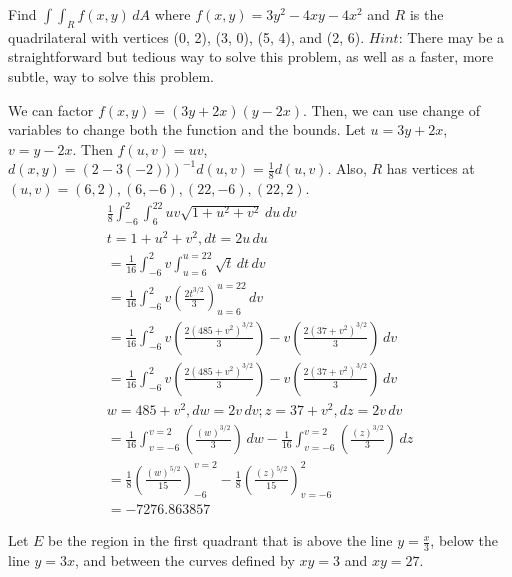 \documentclass[12pt]{exam}
\begin{document}
\begin{questions}
\question Find $\int\int_R f(x, y)\, dA$ where $f(x, y) = 3y^2 - 4xy - 4x^2$ and $R$ is the quadrilateral with vertices (0, 2), (3, 0), (5, 4), and (2, 6). $Hint$: There may be a straightforward but tedious way to solve this problem, as well as a faster, more subtle, way to solve this problem.
	\begin{solution}
		We can factor $f(x, y) = (3y+2x)(y-2x)$. Then, we can use change of variables to change both the function and the bounds. Let $u = 3y + 2x$, $v = y - 2x$. Then $f(u, v) = uv$, $d(x, y) = \left(2 - 3(-2))\right)^{-1} d(u, v) = \frac{1}{8}d(u, v)$. Also, $R$ has vertices at $(u, v) = (6, 2), (6, -6), (22, -6), (22, 2)$.\\
		\begin{gather*}
			\frac{1}{8} \int_{-6}^{2} \int_{6}^{22} uv\sqrt{1 + u^2 + v^2} \, du\, dv \\
			t = 1 + u^2 + v^2, dt = 2u\, du \\
			= \frac{1}{16} \int_{-6}^{2} v \int_{u=6}^{u=22} \sqrt{t} \, dt\, dv \\
			= \frac{1}{16} \int_{-6}^{2} v  \left(\frac{2t^{3/2}}{3}\right)_{u=6}^{u=22}\, dv \\
			= \frac{1}{16} \int_{-6}^{2} v \left(\frac{2(485+v^2)^{3/2}}{3}\right) - v\left(\frac{2(37+v^2)^{3/2}}{3}\right) \, dv \\
			= \frac{1}{16} \int_{-6}^{2} v \left(\frac{2(485+v^2)^{3/2}}{3}\right) - v\left(\frac{2(37+v^2)^{3/2}}{3}\right) \, dv \\
			w = 485+v^2, dw = 2v\, dv; z = 37+v^2, dz = 2v\, dv \\
			= \frac{1}{16} \int_{v = -6}^{v = 2} \left(\frac{(w)^{3/2}}{3}\right) \, dw - \frac{1}{16} \int_{v = -6}^{v = 2} \left(\frac{(z)^{3/2}}{3}\right) \, dz \\
			= \frac{1}{8} \left(\frac{(w)^{5/2}}{15}\right)_{-6}^{v = 2} - \frac{1}{8} \left(\frac{(z)^{5/2}}{15}\right)_{v = -6}^{2} \\
			= \boxed{-7276.863857} \tag*{\qed}
		\end{gather*}
	\end{solution}
\question Let $E$ be the region in the ﬁrst quadrant that is above the line $y = \frac{x}{3}$, below the line $y = 3x$, and
between the curves deﬁned by $xy = 3$ and $xy = 27$.
\end{questions}
\end{document}
